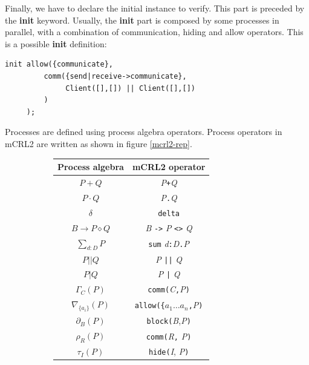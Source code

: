 \documentclass[11pt]{article}
\theoremstyle{definition}
\theoremstyle{plain}
\begin{document}
Finally, we have to declare the initial instance to verify. This part is preceded by the \textbf{init} keyword. Usually, the \textbf{init} part is composed by some processes in parallel, with a combination of communication, hiding and allow operators. This is a possible \textbf{init} definition:

\begin{lstlisting}
init allow({communicate},
         comm({send|receive->communicate},
              Client([],[]) || Client([],[])
         )
     );
\end{lstlisting}

Processes are defined using process algebra operators. Process operators in mCRL2 are written as shown in figure \ref{mcrl2-rep}.

\begin{figure}
\centering
\begin{subfigure}{0.49\textwidth}
\centering
\begin{tabular}{c c}
	Process algebra & mCRL2 operator \\
	\hline
	$ P + Q $ & \textit{P}\texttt{+}\textit{Q} \\
	$ P \cdot Q $ & \textit{P}\texttt{.}\textit{Q} \\
	$ \delta $ & \texttt{delta} \\
	$ B \rightarrow P \diamond Q $ & \textit{B} \texttt{->} \textit{P} \texttt{<>} \textit{Q} \\
	$ \sum_{d:D} P$ & \texttt{sum} \textit{d}\texttt{:}\textit{D}\texttt{.}\textit{P} \\
	$ P \vert\vert Q $ & \textit{P} \texttt{||} \textit{Q} \\
	$ P \vert Q $ & \textit{P} \texttt{|} \textit{Q} \\
	$ \Gamma_{C}(P) $ & \texttt{comm(}\textit{C}\texttt{,}\textit{P}\texttt{)} \\
	$ \nabla_{\big\{a_i\big\}}(P) $ & \texttt{allow(\{}\textit{$ a_1 \dots a_n $}\texttt{,}\textit{P}\texttt{)} \\
	$ \partial_B(P) $ & \texttt{block(}\textit{B},\textit{P}\texttt{)} \\
	$ \rho_R(P) $ & \texttt{comm(}\textit{R}\texttt{,} \textit{P}\texttt{)} \\
	$ \tau_I(P) $ & \texttt{hide(}\textit{I}, \textit{P}\texttt{)}
\end{tabular} 
\end{subfigure}
\begin{subfigure}{0.49\textwidth}
\centering
\begin{tabular}{c c}

\end{tabular}
\end{subfigure}
\end{figure}
\end{document}
